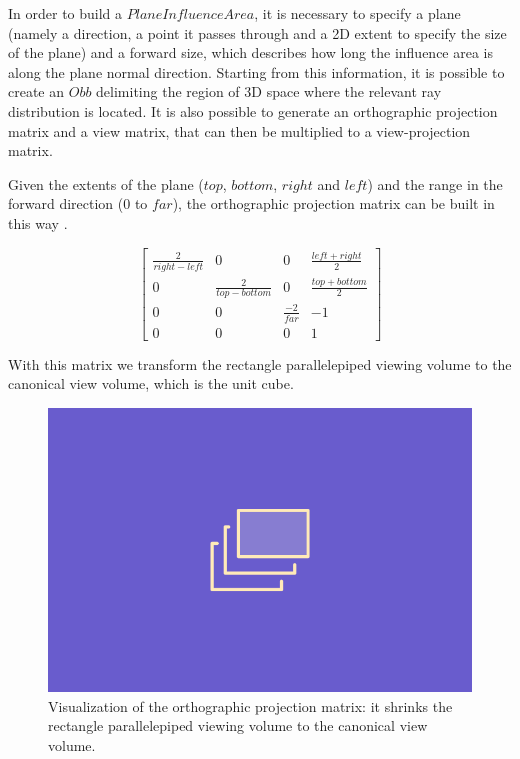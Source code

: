 \documentclass{PoliMi_MasterThesis}
\begin{document}
In order to build a $PlaneInfluenceArea$, it is necessary to specify a plane (namely a direction, a point it passes through and a 2D extent to specify the size of the plane) and a forward size, which describes how long the influence area is along the plane normal direction. Starting from this information, it is possible to create an $Obb$ delimiting the region of 3D space where the relevant ray distribution is located. It is also possible to generate an orthographic projection matrix and a view matrix, that can then be multiplied to a view-projection matrix.

Given the extents of the plane ($top$, $bottom$, $right$ and $left$) and the range in the forward direction ($0$ to $far$), the orthographic projection matrix can be built in this way \cite{TODO}.

\begin{equation}
	\begin{bmatrix}
		\frac{2}{right - left} & 0 & 0 & \frac{left + right}{2} \\
		0 & \frac{2}{top - bottom} & 0 & \frac{top + bottom}{2} \\
		0 & 0 & \frac{-2}{far} & -1 \\
		0 & 0 & 0 & 1
	\end{bmatrix}
\end{equation}

With this matrix we transform the rectangle parallelepiped viewing volume to the canonical view volume, which is the unit cube.

\begin{figure}[H]
    \centering
    \includegraphics[width=\textwidth*\real{0.6}]{Images/TODO.png}
    \caption{Visualization of the orthographic projection matrix: it shrinks the rectangle parallelepiped viewing volume to the canonical view volume.}
    \label{fig:canonical_view_volume}
\end{figure}
\end{document}
